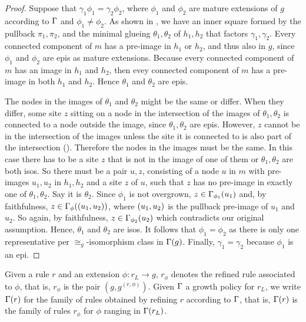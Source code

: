 \begin{proof}
  Suppose that $\gamma_1 \phi_1 = \gamma_2 \phi_2$,
  where $\phi_1$ and $\phi_2$ are mature extensions of $g$
  according to $\Gamma$ and $\phi_1 \neq \phi_2$.
  As shown in ,
  we have an inner square formed by the pullback $\pi_1,\pi_2$,
  and the minimal glueing $\theta_1,\theta_2$ of $h_1,h_2$
  that factors $\gamma_1,\gamma_2$.
  Every connected component of $m$
  has a pre-image in $h_1$ or $h_2$,
  and thus also in $g$,
  since $\phi_1$ and $\phi_2$ are epis
  as mature extensions.
  Because every connected component of $m$
  has an image in $h_1$ and $h_2$,
  then evey connected component of $m$
  has a pre-image in both $h_1$ and $h_2$.
  Hence $\theta_1$ and $\theta_2$ are epis.

  The nodes in the images of $\theta_1$ and $\theta_2$
  might be the same or differ.
  When they differ, some site $z$ sitting on a node
  in the intersection of the images of $\theta_1,\theta_2$
  is connected to a node outside the image,
  since $\theta_1,\theta_2$ are epis.
  However, $z$ cannot be in the intersection of the images
  unless the site it is connected to is also part of the intersection
  ().
  Therefore the nodes in the images must be the same.
  In this case there has to be a site $z$
  that is not in the image of one of them
  or $\theta_1,\theta_2$ are both isos.
  So there must be a pair $u,z$,
  consisting of a node $u$ in $m$
  with pre-images $u_1,u_2$ in $h_1,h_2$
  and a site $z$ of $u$,
  such that $z$ has no pre-image
  in exactly one of $\theta_1,\theta_2$.
  Say it is $\theta_2$.
  Since $\phi_1$ is not overgrown,
  $z \in \Gamma_{\phi_1}(u_1)$ and, by faithfulness,
  $z \in \Gamma_\phi(\left(u_1,u_2\right))$,
  where $\left(u_1,u_2\right)$ is
  the pullback pre-image of $u_1$ and $u_2$.
  So again, by faithfulness, $z \in \Gamma_{\phi_2}(u_2)$
  which contradicts our original assumption.
  Hence, $\theta_1$ and $\theta_2$ are isos.
  It follows that $\phi_1 = \phi_2$ as there is only
  one representative per $\cong_g$-isomorphism class in $\Gamma(g)$.
  Finally, $\gamma_1 = \gamma_2$ because $\phi_1$ is an epi.
\end{proof}

Given a rule $r$ and an extension $\phi: r_L \to g$, %
$r_\phi$ denotes the refined rule associated to $\phi$,
that is, $r_\phi$ is the pair $(g,g^{(r,\phi)})$.
%
Given $\Gamma$ a growth policy for $r_L$,
we write $\Gamma(r)$ for the family of rules
obtained by refining $r$ according to $\Gamma$,
that is, $\Gamma(r)$ is the family of rules $r_\phi$
for $\phi$ ranging in $\Gamma(r_L)$.

